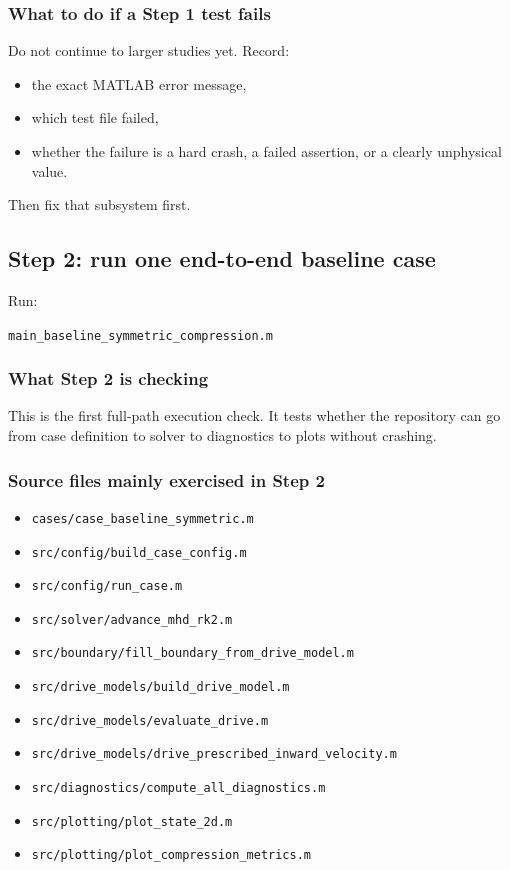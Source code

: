 \documentclass[11pt]{article}
\begin{document}
\subsubsection{What to do if a Step 1 test fails}
Do not continue to larger studies yet. Record:
\begin{itemize}[leftmargin=1.8em]
    \item the exact MATLAB error message,
    \item which test file failed,
    \item whether the failure is a hard crash, a failed assertion, or a clearly unphysical value.
\end{itemize}
Then fix that subsystem first.

\subsection{Step 2: run one end-to-end baseline case}
Run:
\begin{center}
\texttt{main\_baseline\_symmetric\_compression.m}
\end{center}

\subsubsection{What Step 2 is checking}
This is the first full-path execution check. It tests whether the repository can go from case definition to solver to diagnostics to plots without crashing.

\subsubsection{Source files mainly exercised in Step 2}
\begin{itemize}[leftmargin=1.8em]
    \item \texttt{cases/case\_baseline\_symmetric.m}
    \item \texttt{src/config/build\_case\_config.m}
    \item \texttt{src/config/run\_case.m}
    \item \texttt{src/solver/advance\_mhd\_rk2.m}
    \item \texttt{src/boundary/fill\_boundary\_from\_drive\_model.m}
    \item \texttt{src/drive\_models/build\_drive\_model.m}
    \item \texttt{src/drive\_models/evaluate\_drive.m}
    \item \texttt{src/drive\_models/drive\_prescribed\_inward\_velocity.m}
    \item \texttt{src/diagnostics/compute\_all\_diagnostics.m}
    \item \texttt{src/plotting/plot\_state\_2d.m}
    \item \texttt{src/plotting/plot\_compression\_metrics.m}
\end{itemize}
\end{document}
